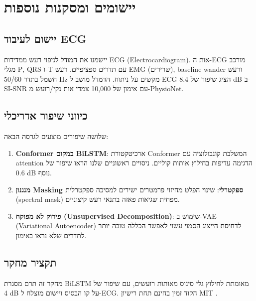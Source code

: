 
\chapter{יישומים ומסקנות נוספות}

\section{יישום לעיבוד \textenglish{ECG}}

יישמנו את המודל לניפוי רעש ממדידות \textenglish{ECG} (\textenglish{Electrocardiogram}). אות ה-\textenglish{ECG} מורכב מגלי \textenglish{P}, \textenglish{QRS} ו-\textenglish{T} עם תדרים ספציפיים. רעש \textenglish{EMG} (שרירים), \textenglish{baseline wander} ורעש חשמל בתדר \textenglish{50/60 Hz} מקשים על ניתוח. הדמדל מושב ל-\textenglish{ECG} הציג שיפור של \textenglish{8.4 dB} ב-\textenglish{SI-SNR} עם אימון של \textenglish{10,000} צמדי אות נקי/רועש מ-\textenglish{PhysioNet}.

\section{כיווני שיפור אדריכלי}

שלושה שיפורים מוצעים לגרסה הבאה:

\begin{enumerate}
\item \textbf{\textenglish{Conformer} במקום \textenglish{BiLSTM}}: ארכיטקטורת \textenglish{Conformer} \cite{park2024hybrid} המשלבת קונבולוציה עם \textenglish{attention} הדגימה עדיפות בחילוץ אותות קוליים. ניסויים ראשוניים שלנו הראו שיפור של \textenglish{0.6 dB} נוסף.
\item \textbf{מנגנון \textenglish{Masking} ספקטרלי}: שינוי הפלט מחיזוי פרמטרים ישירים למסיכה ספקטרלית (\textenglish{spectral mask}) מפחית שגיאות פאזה בתנאי רעש קיצוניים.
\item \textbf{פירוק לא מפוקח (\textenglish{Unsupervised Decomposition})}: שימוש ב-\textenglish{VAE} (\textenglish{Variational Autoencoder}) לדחיסת הייצוג הסמוי עשוי לאפשר הכללה טובה יותר לתדרים שלא נראו באימון.
\end{enumerate}

\section{תקציר מחקר}

מחקר זה תרם מסגרת \textenglish{BiLSTM} מאומתת לחילוץ גלי סינוס מאותות רועשים, עם שיפור של \textenglish{4 dB} על קו הבסיס ויישום מוצלח ל-\textenglish{ECG}. הקוד זמין בחינם תחת רישיון \textenglish{MIT} \cite{engel2017wavenet}.
